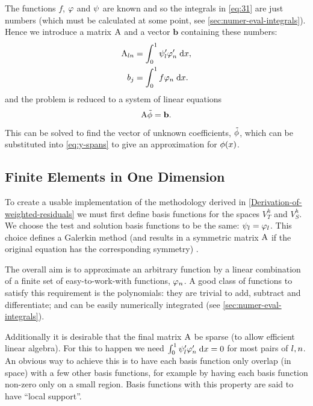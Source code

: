 The functions $f$, $\varphi$ and $\psi$ are known and so the integrals in \cref{eq:31} are just numbers (which must be calculated at some point, see \cref{sec:numer-eval-integrals}).
Hence we introduce a matrix $\mathrm{A}$ and a vector $\mathbf{b}$ containing these numbers:
\begin{equation}
  \begin{aligned}
    \mathrm{A}_{ln} &= {\int_0^1  \psi_{l}'\varphi'_{n}  {\; \mathrm{{d}}}{x}}, \\
    b_{j} &= {\int_0^1  f\varphi_{n}  {\; \mathrm{{d}}}{x}}. \\
    \label{eq:Aij_bj}
  \end{aligned}
\end{equation}
and the problem is reduced to a system of linear equations
\begin{equation}
  \mathrm{A} \tilde{\phi} = {\mathbf{b}}.
  \label{eq:final_galerkin}
\end{equation}
This can be solved to find the vector of unknown coefficients, $\tilde{\phi}$, which can be substituted into \cref{eq:y-spans} to give an approximation for $\phi(x)$.


\subsection{Finite Elements in One Dimension}
\label{sub:Actual-Finite-Elements}

To create a usable implementation of the methodology derived in \cref{Derivation-of-weighted-residuals} we must first define basis functions for the spaces $V_{T}^{h}$ and $V_S^h$.
We choose the test and solution basis functions to be the same: $\psi_l = \varphi_l$.
This choice defines a Galerkin method (and results in a symmetric matrix $\mathrm{A}$ if the original equation has the corresponding symmetry) \cite[215]{Zeinkiewicz1967}.

The overall aim is to approximate an arbitrary function by a linear combination of a finite set of easy-to-work-with functions, $\varphi_n$.
A good class of functions to satisfy this requirement is the polynomials: they are trivial to add, subtract and differentiate; and can be easily numerically integrated (see \cref{sec:numer-eval-integrals}).

Additionally it is desirable that the final matrix $\mathrm{A}$ be sparse (to allow efficient linear algebra).
For this to happen we need ${\int_0^1  \psi_{l}'\varphi'_{n}  {\; \mathrm{{d}}}{x}} = 0$ for most pairs of $l, n$. 
An obvious way to achieve this is to have each basis function only overlap (in space) with a few other basis functions, for example by having each basis function non-zero only on a small region.
Basis functions with this property are said to have ``local support''.

